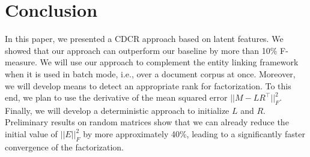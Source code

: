
\section{Conclusion}
\label{cha314:sec:conclusion}
In this paper, we presented a CDCR approach based on latent features.
We showed that our approach can outperform our baseline by more than 10\% F-measure.
We will use our approach to complement the entity linking framework~\cite{AGDISTIS_ISWC} when it is used in batch mode, i.e., over a document corpus at once.
Moreover, we will develop means to detect an appropriate rank for factorization.
To this end, we plan to use the derivative of the mean squared error $||M - LR^{\top}||^2_F$.
Finally, we will develop a deterministic approach to initialize $L$ and $R$. 
Preliminary results on random matrices show that we can already reduce the initial value of $||E||^2_F$ by more approximately 40\%, leading to a significantly faster convergence of the factorization.



%

